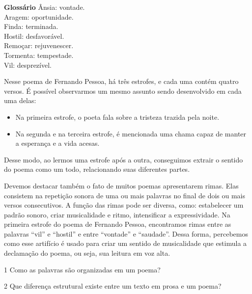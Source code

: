 {\begin{quote}
\end{quote}

\textbf{Glossário}
Ânsia: vontade.\\
Aragem: oportunidade.\\
Finda: terminada.\\
Hostil: desfavorável.\\
Remoçar: rejuvenescer.\\
Tormenta: tempestade.\\
Vil: desprezível.

Nesse poema de Fernando Pessoa, há três estrofes, e cada
uma contém quatro versos. É possível observarmos um
mesmo assunto sendo desenvolvido em cada uma delas:

\begin{itemize}
\item Na primeira estrofe, o poeta fala sobre a tristeza trazida pela noite.

\item Na segunda e na terceira estrofe, é mencionada uma chama capaz de manter a esperança e a vida
acesas.
\end{itemize}

Desse modo, ao lermos uma estrofe após a outra, conseguimos
extrair o sentido do poema como um todo, relacionando suas diferentes
partes.

Devemos destacar também o fato de muitos poemas apresentarem rimas. Elas
consistem na repetição sonora de uma ou mais palavras no final de dois
ou mais versos consecutivos. A função das rimas pode ser diversa, como:
estabelecer um padrão sonoro, criar musicalidade e ritmo, intensificar a
expressividade. Na primeira estrofe do poema de Fernando
Pessoa, encontramos rimas entre as palavras “vil” e “hostil” e entre “vontade”
e “saudade”. Dessa forma, percebemos como esse artifício é usado
para criar um sentido de musicalidade que estimula a declamação do
poema, ou seja, sua leitura em voz alta.}


\num{1} Como as palavras são organizadas em um poema?


\num{2} Que diferença estrutural existe entre um texto em prosa e um poema?


